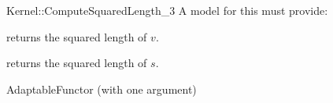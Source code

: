 \begin{ccRefFunctionObjectConcept}{Kernel::ComputeSquaredLength_3}
A model for this must provide:


       {returns the squared length of $v$. }

       {returns the squared length of $s$. }

\ccRefines
AdaptableFunctor (with one argument)

\ccSeeAlso
{} \\
 \\

\end{ccRefFunctionObjectConcept}
